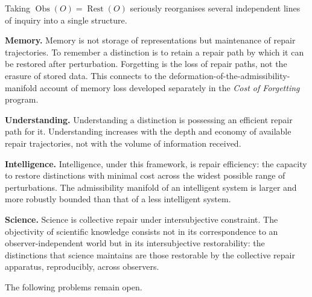 \documentclass[12pt, oneside]{article}
\theoremstyle{plain}
\theoremstyle{definition}
\theoremstyle{remark}
\theoremstyle{definition}
\DeclareMathOperator{\Obs}{Obs}
\DeclareMathOperator{\Rest}{Rest}
\begin{document}
Taking $\Obs(O) = \Rest(O)$ seriously reorganises several independent
lines of inquiry into a single structure.

\medskip\noindent
\textbf{Memory.}\;
Memory is not storage of representations but maintenance of repair
trajectories.
To remember a distinction is to retain a repair path by which it can
be restored after perturbation.
Forgetting is the loss of repair paths, not the erasure of stored
data.
This connects to the deformation-of-the-admissibility-manifold account
of memory loss developed separately in the \emph{Cost of Forgetting}
program.

\medskip\noindent
\textbf{Understanding.}\;
Understanding a distinction is possessing an efficient repair path
for it.
Understanding increases with the depth and economy of available repair
trajectories, not with the volume of information received.

\medskip\noindent
\textbf{Intelligence.}\;
Intelligence, under this framework, is repair efficiency: the capacity
to restore distinctions with minimal cost across the widest possible
range of perturbations.
The admissibility manifold of an intelligent system is larger and more
robustly bounded than that of a less intelligent system.

\medskip\noindent
\textbf{Science.}\;
Science is collective repair under intersubjective constraint.
The objectivity of scientific knowledge consists not in its
correspondence to an observer-independent world but in its
intersubjective restorability: the distinctions that science maintains
are those restorable by the collective repair apparatus, reproducibly,
across observers.

\medskip
The following problems remain open.
\end{document}
